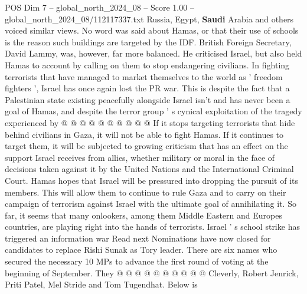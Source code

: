 \begin{textsample}{POS Dim 7 – global\_north\_2024\_08 – Score 1.00 – global\_north\_2024\_08/112117337.txt}
Russia, Egypt, \textbf{Saudi} Arabia and others voiced similar views.
No word was said about Hamas, or that their use of schools is the reason such buildings are targeted by the IDF.
British Foreign Secretary, David Lammy, was, however, far more balanced.
He criticised Israel, but also held Hamas to account by calling on them to stop endangering civilians.
In fighting terrorists that have managed to market themselves to the world as ' freedom fighters ', Israel has once again lost the PR war.
This is despite the fact that a Palestinian state existing peacefully alongside Israel isn't and has never been a goal of Hamas, and despite the terror group ' s cynical exploitation of the tragedy experienced by @ @ @ @ @ @ @ @ @ @ If it stops targeting terrorists that hide behind civilians in Gaza, it will not be able to fight Hamas.
If it continues to target them, it will be subjected to growing criticism that has an effect on the support Israel receives from allies, whether military or moral in the face of decisions taken against it by the United Nations and the International Criminal Court.
Hamas hopes that Israel will be pressured into dropping the pursuit of its members.
This will allow them to continue to rule Gaza and to carry on their campaign of terrorism against Israel with the ultimate goal of annihilating it.
So far, it seems that many onlookers, among them Middle Eastern and Europes countries, are playing right into the hands of terrorists.
Israel ' s school strike has triggered an information war Read next Nominations have now closed for candidates to replace Rishi Sunak as Tory leader.
There are six names who secured the necessary 10 MPs to advance the first round of voting at the beginning of September.
They @ @ @ @ @ @ @ @ @ @ Cleverly, Robert Jenrick, Priti Patel, Mel Stride and Tom Tugendhat.
Below is

\end{textsample}
